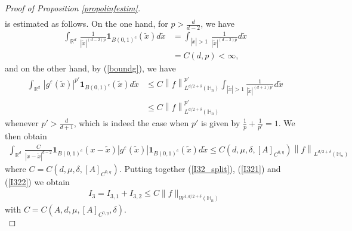 \documentclass[11pt, reqno]{amsart}
\theoremstyle{definition}
\theoremstyle{remark}
\numberwithin{equation}{section}
\begin{document}
\begin{proof}[Proof of Proposition \textup{\ref{propolinfestim}}]
\begin{align*}
		\end{align*} 
		is estimated as follows. On the one hand, for $p>\frac{d}{d-2}$,  we have
		\begin{align*}
			\int_{\mathbb{R}^d} \,  \frac{1}{|\tilde{x}|^{(d-2)p}}  \mathbf{1}_{B(0,1)^c} (\tilde{x}) d\tilde{x}&=  \int_{| \tilde{x}|>1} \,  \frac{1}{|\tilde{x}|^{(d-2)p}}  d\tilde{x}\\
			&= C(d,p)<\infty, 
		\end{align*} 
		and on the other hand,  by (\ref{boundg}), we have 
		\begin{align*}
			\int_{\mathbb{R}^d} \,  |g^\varepsilon(\tilde{x}) |^{p'} \mathbf{1}_{B(0,1)^c} (\tilde{x}) d\tilde{x} & \leq  C\left\|f\right\|^{p'}_{L^{d/2+\delta}(\mathbb{H}_n)}	\int_{|\tilde{x}|>1} \frac{1}{|\tilde{x}|^{(d+1)p'}} d\tilde{x} \\
			& \leq  C\left\|f\right\|^{p'}_{L^{d/2+\delta}(\mathbb{H}_n)}	
		\end{align*}
		whenever $p'>\frac{d}{d+1}$, which is indeed the case when $p'$ is given by $\frac{1}{p}+\frac{1}{p'}=1$. We then obtain 
		\begin{align}
			\int_{\mathbb{R}^d} \,  \frac{C}{|x- \tilde{x}|^{d-2}}   \mathbf{1}_{B(0,1)^c} (x- \tilde{x})|g^\varepsilon(\tilde{x}) | \mathbf{1}_{B(0,1)^c} (\tilde{x}) d\tilde{x}\leq  C(d,\mu,\delta,[A]_{C^{0,\eta}})\left\|f\right\|^{}_{L^{d/2+\delta}(\mathbb{H}_n)}\label{I322}
		\end{align} 
	where $C=	 C (d, \mu, \delta,[A]_{C^{0,\eta}})$. 
	Putting together (\ref{I32_split}), (\ref{I321}) and (\ref{I322}) we obtain
		\begin{align*}
			I_{3}= 	I_{3,1}+	I_{3,2}
			\leq  C\|f\|_{W^{1,d/2+\delta}(\mathbb{H}_n)}
		\end{align*}
		with	 $C=C\left(A,d, \mu, [A]_{C^{0,\eta}},\delta\right)$.\\
		

\end{proof}
\end{document}
